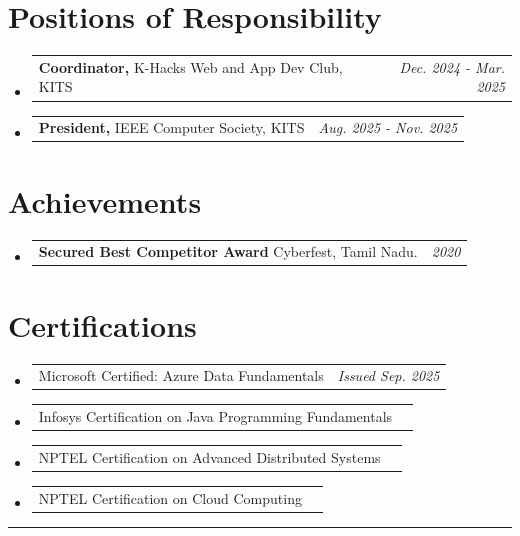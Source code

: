 \documentclass[a4paper,11pt]{article}
\makeatletter
\newcommand{\resumePOR}[3]{
\vspace{0.5mm}\item
    \begin{tabular*}{0.97\textwidth}[t]{l@{\extracolsep{\fill}}r}
        \textbf{#1}\hspace{0.3mm}#2 & \textit{\small{#3}} 
    \end{tabular*}
    \vspace{-2mm}
}
\newcommand{\resumeSubHeadingListStart}{\begin{itemize}[leftmargin=*,labelsep=0mm]}
\newcommand{\resumeSubHeadingListEnd}{\end{itemize}\vspace{2mm}}
\makeatother
\begin{document}
\section{Positions of Responsibility}
\vspace{-0.4mm}
\resumeSubHeadingListStart
\resumePOR{Coordinator, } %
{K-Hacks Web and App Dev Club, KITS} %
{Dec. 2024 - Mar. 2025} %
\resumePOR{President, } %
{IEEE Computer Society, KITS} %
{Aug. 2025 - Nov. 2025} %
\resumeSubHeadingListEnd
\vspace{-4mm}


\section{Achievements}
\vspace{-0.4mm}
\resumeSubHeadingListStart
\resumePOR{Secured Best Competitor Award } %
{Cyberfest, Tamil Nadu.} %
{2020} %


    

\resumeSubHeadingListEnd
\vspace{-4mm}

\section{Certifications}
\vspace{-0.2mm}
\resumeSubHeadingListStart
\resumePOR{}{
    Microsoft Certified: Azure Data Fundamentals
}{Issued Sep. 2025}

\resumePOR{}{
    Infosys Certification on Java Programming Fundamentals
}{}

\resumePOR{}{
    NPTEL Certification on Advanced Distributed Systems
}{}

\resumePOR{}{
    NPTEL Certification on Cloud Computing
}{}

\resumeSubHeadingListEnd



\hspace*{-5mm}\rule{1.035\textwidth}{0.1mm}

\end{document}
